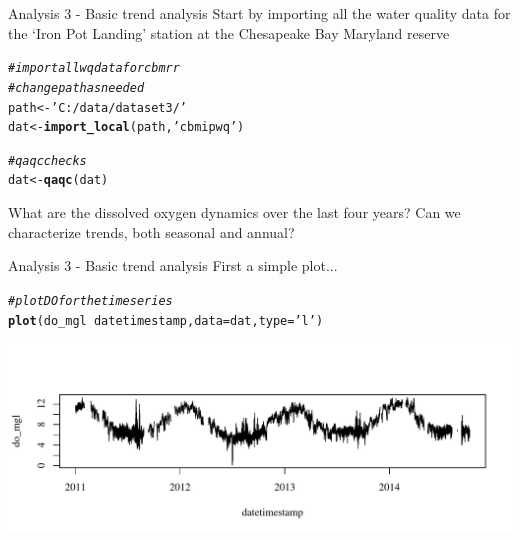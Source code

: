 \documentclass[xcolor=svgnames]{beamer}\usepackage[]{graphicx}\usepackage[]{color}
\makeatletter
\newcommand{\hlstr}[1]{\textcolor[rgb]{0.192,0.494,0.8}{#1}}%
\newcommand{\hlcom}[1]{\textcolor[rgb]{0.678,0.584,0.686}{\textit{#1}}}%
\newcommand{\hlopt}[1]{\textcolor[rgb]{0,0,0}{#1}}%
\newcommand{\hlstd}[1]{\textcolor[rgb]{0.345,0.345,0.345}{#1}}%
\newcommand{\hlkwb}[1]{\textcolor[rgb]{0.69,0.353,0.396}{#1}}%
\newcommand{\hlkwc}[1]{\textcolor[rgb]{0.333,0.667,0.333}{#1}}%
\newcommand{\hlkwd}[1]{\textcolor[rgb]{0.737,0.353,0.396}{\textbf{#1}}}%
\newenvironment{kframe}{%
 \def\at@end@of@kframe{}%
 \ifinner\ifhmode%
  \def\at@end@of@kframe{\end{minipage}}%
  \begin{minipage}{\columnwidth}%
 \fi\fi%
 \def\FrameCommand##1{\hskip\@totalleftmargin \hskip-\fboxsep
 \colorbox{shadecolor}{##1}\hskip-\fboxsep
     \hskip-\linewidth \hskip-\@totalleftmargin \hskip\columnwidth}%
 \MakeFramed {\advance\hsize-\width
   \@totalleftmargin\z@ \linewidth\hsize
   \@setminipage}}%
 {\par\unskip\endMakeFramed%
 \at@end@of@kframe}
\newenvironment{knitrout}{}{} %
\makeatother
\begin{document}
\begin{frame}[containsverbatim]{Analysis 3 - Basic trend analysis}
Start by importing all the water quality data for the `Iron Pot Landing' station at the Chesapeake Bay Maryland reserve 

\begin{knitrout}\scriptsize
{}\color{fgcolor}\begin{kframe}
\begin{alltt}
\hlcom{# import all wq data for cbmrr}
\hlcom{# change path as needed}
\hlstd{path} \hlkwb{<-} \hlstr{'C:/data/dataset3/'}
\hlstd{dat} \hlkwb{<-} \hlkwd{import_local}\hlstd{(path,} \hlstr{'cbmipwq'}\hlstd{)}

\hlcom{# qaqc checks}
\hlstd{dat} \hlkwb{<-} \hlkwd{qaqc}\hlstd{(dat)}
\end{alltt}
\end{kframe}
\end{knitrout}
What are the dissolved oxygen dynamics over the last four years?  Can we characterize trends, both seasonal and annual?
\end{frame}

\begin{frame}[containsverbatim]{Analysis 3 - Basic trend analysis}
First a simple plot...
\begin{knitrout}\scriptsize
{}\color{fgcolor}\begin{kframe}
\begin{alltt}
\hlcom{# plot DO for the time series}
\hlkwd{plot}\hlstd{(do_mgl} \hlopt{~} \hlstd{datetimestamp,} \hlkwc{data} \hlstd{= dat,} \hlkwc{type} \hlstd{=} \hlstr{'l'}\hlstd{)}
\end{alltt}
\end{kframe}

{\centering \includegraphics[width=\textwidth]{figure/unnamed-chunk-17} 

}



\end{knitrout}
\end{frame}
\end{document}

